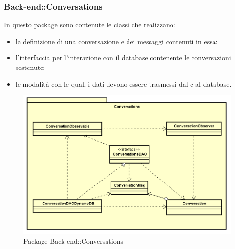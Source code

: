 \subsubsection{Back-end::Conversations}
In questo package sono contenute le classi che realizzano:
\begin{itemize}
 \item la definizione di una conversazione e dei messaggi contenuti in essa;
 \item l'interfaccia per l'interazione con il database contenente le conversazioni sostenute;
 \item le modalità con le quali i dati devono essere trasmessi dal e al database.
\end{itemize}
\begin{figure}[h] \centering \includegraphics[width=\textwidth,height=\textheight,keepaspectratio]{images/diagrams/back-end/Official_Backend_0304/Conversations.png}
	\caption{Package Back-end::Conversations}
\end{figure}
